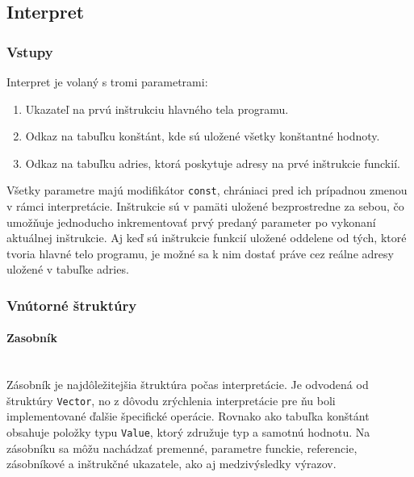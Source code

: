 \documentclass[12pt,a4paper,titlepage,final]{article}
\begin{document}
\subsection{Interpret}

\subsubsection{Vstupy}
Interpret je volaný s tromi parametrami:
\begin{enumerate}
    \itemsep0em
    \item Ukazateľ na prvú inštrukciu hlavného tela programu.
    \item Odkaz na tabuľku konštánt, kde sú uložené všetky konštantné hodnoty.
    \item Odkaz na tabuľku adries, ktorá poskytuje adresy na prvé inštrukcie funckií.
\end{enumerate}
Všetky parametre majú modifikátor \texttt{const}, chrániaci pred ich prípadnou zmenou
v rámci interpretácie. Inštrukcie sú v pamäti uložené bezprostredne za sebou, čo
umožňuje jednoducho inkrementovať prvý predaný parameter po vykonaní aktuálnej
inštrukcie. Aj keď sú inštrukcie funkcií uložené oddelene od tých, ktoré tvoria hlavné
telo programu, je možné sa k nim dostať práve cez reálne adresy uložené v tabuľke adries.

\subsubsection{Vnútorné štruktúry}

\paragraph{Zasobník}\mbox{}\\

Zásobník je najdôležitejšia štruktúra počas interpretácie. Je odvodená od štruktúry
\texttt{Vector}, no z dôvodu zrýchlenia interpretácie pre ňu boli implementované ďalšie
špecifické operácie. Rovnako ako tabuľka konštánt obsahuje položky typu \texttt{Value}, 
ktorý združuje typ a samotnú hodnotu. Na zásobníku sa môžu nachádzať premenné, parametre
funckie, referencie, zásobníkové a inštrukčné ukazatele, ako aj medzivýsledky výrazov.
\end{document}
